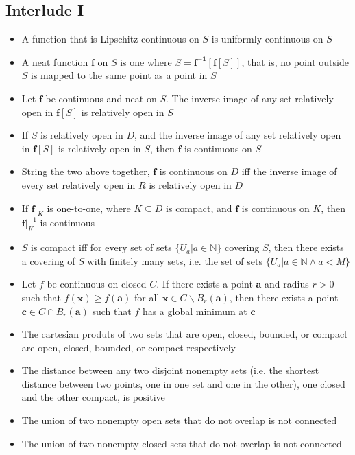 \documentclass[10pt, oneside]{article}
\let\geq\geqslant
\newcommand{\N}{\mathbb{N}}
\renewcommand{\vec}[1]{\mathbf{#1}}
\newcommand{\vecf}[1]{\boldsymbol{#1}}
\begin{document}
\subsection{Interlude I}
\begin{itemize}
    \item A function that is Lipschitz continuous on $S$ is uniformly continuous on $S$
    \item A neat function $\vecf{f}$ on $S$ is one where $S = \vecf{f^{-1}}[\vecf{f}[S]]$, that is, no point outside $S$ is mapped to the same point as a point in $S$
    \item Let $\vecf{f}$ be continuous and neat on $S$. The inverse image of any set relatively open in $\vecf{f}[S]$ is relatively open in $S$
    \item If $S$ is relatively open in $D$, and the inverse image of any set relatively open in $\vecf{f}[S]$ is relatively open in $S$, then $\vecf{f}$ is continuous on $S$
    \item String the two above together, $\vecf{f}$ is continuous on $D$ iff the inverse image of every set relatively open in $R$ is relatively open in $D$
    \item If $\vecf{f}|_K$ is one-to-one, where $K \subseteq D$ is compact, and $\vecf{f}$ is continuous on $K$, then $\vecf{f}|^{-1}_K$ is continuous
    \item $S$ is compact iff for every set of sets $\{U_a | a \in \N \}$ covering $S$, then there exists a covering of $S$ with finitely many sets, i.e. the set of sets $\{U_a | a \in \N \land a < M\}$
    \item Let $f$ be continuous on closed $C$. If there exists a point $\vec{a}$ and radius $r > 0$ such that $f(\vec{x}) \geq f(\vec{a})$ for all $\vec{x} \in C \backslash B_r(\vec{a})$, then there exists a point $\vec{c} \in C \cap B_r(\vec{a})$ such that $f$ has a global minimum at $\vec{c}$
    \item The cartesian produts of two sets that are open, closed, bounded, or compact are open, closed, bounded, or compact respectively
    \item The distance between any two disjoint nonempty sets (i.e. the shortest distance between two points, one in one set and one in the other), one closed and the other compact, is positive
    \item The union of two nonempty open sets that do not overlap is not connected
    \item The union of two nonempty closed sets that do not overlap is not connected
\end{itemize}
\end{document}
